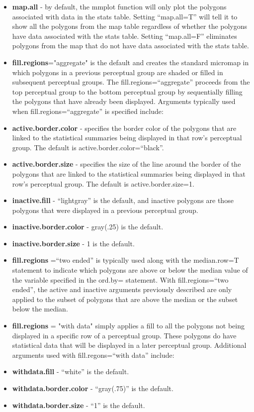 \documentclass{article}
\begin{document}
\begin{itemize}
\item \textbf{map.all} - by default, the mmplot function will only plot the polygons associated with data in the stats table. Setting ``map.all=T'' will tell it to show all the polygons from the map table regardless of whether the polygons have data associated with the stats table.  Setting ``map.all=F'' eliminates polygons from the map that do not have data associated with the stats table.
\item \textbf{fill.regions}="aggregate" is the default and creates the standard micromap in which polygons in a previous perceptual group are shaded or filled in subsequent perceptual groups.  The fill.regions=``aggregate'' proceeds from the top perceptual group to the bottom perceptual group by sequentially filling the polygons that have already been displayed.  Arguments typically used when fill.regions=``aggregate'' is specified include:
\item \textbf{active.border.color} - specifies the border color of the polygons that are linked to the statistical summaries being displayed in that row's perceptual group.  The default is active.border.color=``black''.
\item \textbf{active.border.size} - specifies the size of the line around the border of the polygons that are linked to the statistical summaries being displayed in that row's perceptual group.  The default is active.border.size=1.
\item \textbf{inactive.fill} - ``lightgray'' is the default, and inactive polygons are those polygons that were displayed in a previous perceptual group.
\item \textbf{inactive.border.color} - gray(.25) is the default.
\item \textbf{inactive.border.size} - 1 is the default.
\item \textbf{fill.regions} =``two ended'' is typically used along with the median.row=T statement to indicate which polygons are above or below the median value of the variable specified in the ord.by= statement.  With fill.regions=``two ended'', the active and inactive arguments previously described are only applied to the subset of polygons that are above the median or the subset below the median.
\item \textbf{fill.regions} = "with data" simply applies a fill to all the polygons not being displayed in a specific row of a perceptual group. These polygons do have statistical data that will be displayed in a later perceptual group.  Additional arguments used with fill.regons=``with data'' include:
\item \textbf{withdata.fill} - ``white'' is the default.
\item \textbf{withdata.border.color} - ``gray(.75)'' is the default.
\item \textbf{withdata.border.size} - ``1'' is the default.
\end{itemize}
\end{document}
